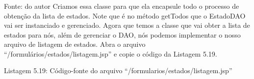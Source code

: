 Fonte: do autor
Criamos essa classe para que ela encapsule todo o processo de obtenção da lista de estados. Note que é no método getTodos que o EstadoDAO vai ser instanciado e gerenciado.
Agora que temos a classe que vai obter a lista de estados para nós, além de gerenciar o DAO, nós podemos implementar o nosso arquivo de listagem de estados. Abra o arquivo “/formulários/estados/listagem.jsp” e copie o código da Listagem 5.19.























Listagem 5.19: Código-fonte do arquivo “/formularios/estados/listagem.jsp”
 
